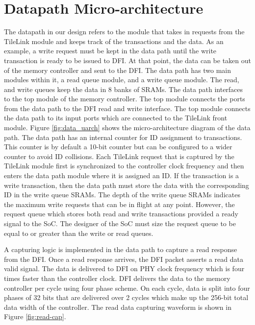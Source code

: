 \section{Datapath Micro-architecture}
The datapath in our design refers to the module that takes in requests from the TileLink module and keeps track of the transactions and the data. As an example, a write request must be kept in the data path until the write transaction is ready to be issued to DFI. At that point, the data can be taken out of the memory controller and sent to the DFI. 
The data path has two main modules within it, a read queue module, and a write queue module. The read, and write queues keep the data in 8 banks of SRAMs.
The data path interfaces to the top module of the memory controller. The top module connects the ports from the data path to the DFI read and write interface. The top module connects the data path to its input ports which are connected to the TileLink front module. Figure \ref{fig:data_uarch} shows the micro-architecture diagram of the data path. The data path has an internal counter for ID assignment to transactions. This counter is by default a 10-bit counter but can be configured to a wider counter to avoid ID collisions. Each TileLink request that is captured by the TileLink module first is synchronized to the controller clock frequency and then enters the data path module where it is assigned an ID. If the transaction is a write transaction, then the data path must store the data with the corresponding ID in the write queue SRAMs. The depth of the write queue SRAMs indicates the maximum write requests that can be in flight at any point. However, the request queue which stores both read and write transactions provided a ready signal to the SoC. The designer of the SoC must size the request queue to be equal to or greater than the write or read queues. 

A capturing logic is implemented in the data path to capture a read response from the DFI. Once a read response arrives, the DFI packet asserts a read data valid signal. The data is delivered to DFI on PHY clock frequency which is four times faster than the controller clock. DFI delivers the data to the memory controller per cycle using four phase scheme. On each cycle, data is split into four phases of 32 bits that are delivered over 2 cycles which make up the 256-bit total data width of the controller. The read data capturing waveform is shown in Figure \ref{fig:read-cap}.

